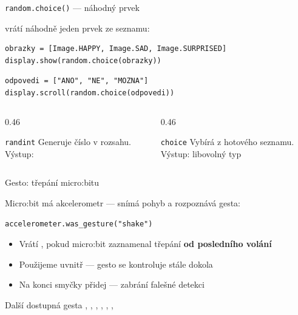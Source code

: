\begin{frame}[fragile]{\texttt{random.choice()} — náhodný prvek}

   vrátí náhodně jeden prvek ze seznamu:

  \bigskip
  \begin{lstlisting}
obrazky = [Image.HAPPY, Image.SAD, Image.SURPRISED]
display.show(random.choice(obrazky))
  \end{lstlisting}

  \bigskip
  \begin{lstlisting}
odpovedi = ["ANO", "NE", "MOZNA"]
display.scroll(random.choice(odpovedi))
  \end{lstlisting}

  \bigskip
  \begin{columns}[T]
    \begin{column}{0.46\textwidth}
      \begin{block}{\texttt{randint}}
        Generuje číslo v rozsahu.\\
        Výstup: 
      \end{block}
    \end{column}
    \begin{column}{0.46\textwidth}
      \begin{block}{\texttt{choice}}
        Vybírá z hotového seznamu.\\
        Výstup: libovolný typ
      \end{block}
    \end{column}
  \end{columns}
\end{frame}

\begin{frame}[fragile]{Gesto: třepání micro:bitu}

  Micro:bit má akcelerometr — snímá pohyb a rozpoznává gesta:

  \bigskip
  \begin{lstlisting}
accelerometer.was_gesture("shake")
  \end{lstlisting}

  \begin{itemize}
    \item Vrátí , pokud micro:bit zaznamenal třepání
          \textbf{od posledního volání}
    \item Použijeme uvnitř  — gesto se kontroluje stále dokola
    \item Na konci smyčky přidej  — zabrání falešné detekci
  \end{itemize}

  \pause\bigskip
  \begin{block}{Další dostupná gesta}
    , , , ,
    , , 
  \end{block}
\end{frame}


